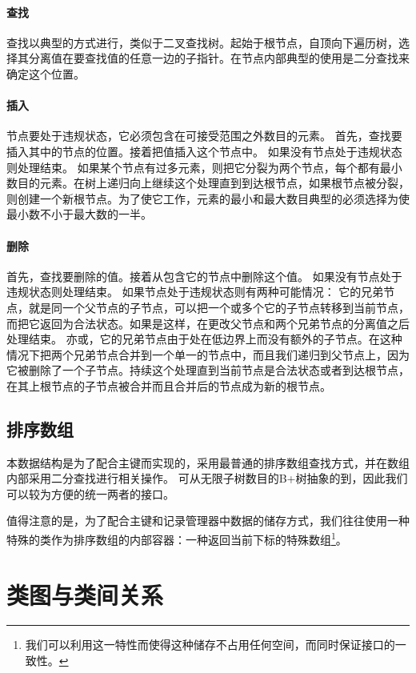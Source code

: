 \documentclass[UTF8]{ctexrep} %
\begin{document}
\paragraph{查找}
查找以典型的方式进行，类似于二叉查找树。起始于根节点，自顶向下遍历树，选择其分离值在要查找值的任意一边的子指针。在节点内部典型的使用是二分查找来确定这个位置。

\paragraph{插入}
节点要处于违规状态，它必须包含在可接受范围之外数目的元素。
首先，查找要插入其中的节点的位置。接着把值插入这个节点中。
如果没有节点处于违规状态则处理结束。
如果某个节点有过多元素，则把它分裂为两个节点，每个都有最小数目的元素。在树上递归向上继续这个处理直到到达根节点，如果根节点被分裂，则创建一个新根节点。为了使它工作，元素的最小和最大数目典型的必须选择为使最小数不小于最大数的一半。

\paragraph{删除}
首先，查找要删除的值。接着从包含它的节点中删除这个值。
如果没有节点处于违规状态则处理结束。
如果节点处于违规状态则有两种可能情况：
它的兄弟节点，就是同一个父节点的子节点，可以把一个或多个它的子节点转移到当前节点，而把它返回为合法状态。如果是这样，在更改父节点和两个兄弟节点的分离值之后处理结束。
亦或，它的兄弟节点由于处在低边界上而没有额外的子节点。在这种情况下把两个兄弟节点合并到一个单一的节点中，而且我们递归到父节点上，因为它被删除了一个子节点。持续这个处理直到当前节点是合法状态或者到达根节点，在其上根节点的子节点被合并而且合并后的节点成为新的根节点。

\subsection{排序数组}
本数据结构是为了配合主键而实现的，采用最普通的排序数组查找方式，并在数组内部采用二分查找进行相关操作。
可从无限子树数目的B+树抽象的到，因此我们可以较为方便的统一两者的接口。
\par
值得注意的是，为了配合主键和记录管理器中数据的储存方式，我们往往使用一种特殊的类作为排序数组的内部容器：一种返回当前下标的特殊数组\footnote{我们可以利用这一特性而使得这种储存不占用任何空间，而同时保证接口的一致性。}。

\section{类图与类间关系}
\end{document}
